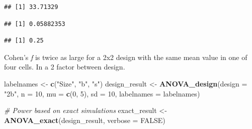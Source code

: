 \documentclass[
]{book}
\newenvironment{Shaded}{\begin{snugshade}}{\end{snugshade}}
\newcommand{\CommentTok}[1]{\textcolor[rgb]{0.56,0.35,0.01}{\textit{#1}}}
\newcommand{\DataTypeTok}[1]{\textcolor[rgb]{0.13,0.29,0.53}{#1}}
\newcommand{\DecValTok}[1]{\textcolor[rgb]{0.00,0.00,0.81}{#1}}
\newcommand{\KeywordTok}[1]{\textcolor[rgb]{0.13,0.29,0.53}{\textbf{#1}}}
\newcommand{\NormalTok}[1]{#1}
\newcommand{\OperatorTok}[1]{\textcolor[rgb]{0.81,0.36,0.00}{\textbf{#1}}}
\newcommand{\OtherTok}[1]{\textcolor[rgb]{0.56,0.35,0.01}{#1}}
\newcommand{\StringTok}[1]{\textcolor[rgb]{0.31,0.60,0.02}{#1}}
\begin{document}
\begin{Shaded}
\end{Shaded}

\begin{verbatim}
## [1] 33.71329
\end{verbatim}

\begin{Shaded}
\end{Shaded}

\begin{verbatim}
## [1] 0.05882353
\end{verbatim}

\begin{Shaded}
\end{Shaded}

\begin{verbatim}
## [1] 0.25
\end{verbatim}

Cohen's \emph{f} is twice as large for a 2x2 design with the same mean value in one of four cells. In a 2 factor between design.

\begin{Shaded}
\begin{Highlighting}[]
\NormalTok{labelnames <-}\StringTok{ }\KeywordTok{c}\NormalTok{(}\StringTok{"Size"}\NormalTok{, }\StringTok{"b"}\NormalTok{, }\StringTok{"s"}\NormalTok{)}
\NormalTok{design_result <-}\StringTok{ }\KeywordTok{ANOVA_design}\NormalTok{(}\DataTypeTok{design =} \StringTok{"2b"}\NormalTok{, }
                              \DataTypeTok{n =} \DecValTok{10}\NormalTok{,  }
                              \DataTypeTok{mu =} \KeywordTok{c}\NormalTok{(}\DecValTok{0}\NormalTok{, }\DecValTok{5}\NormalTok{), }
                              \DataTypeTok{sd =} \DecValTok{10}\NormalTok{, }
                              \DataTypeTok{labelnames =}\NormalTok{ labelnames) }

\CommentTok{# Power based on exact simulations}
\NormalTok{exact_result <-}\StringTok{ }\KeywordTok{ANOVA_exact}\NormalTok{(design_result,}
                            \DataTypeTok{verbose =} \OtherTok{FALSE}\NormalTok{)}
\end{Highlighting}
\end{Shaded}
\end{document}
